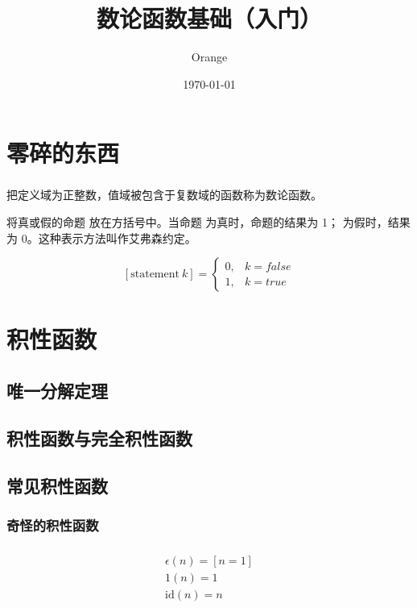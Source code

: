 \documentclass[UTF8]{beamer}
\title{数论函数基础（入门）}
\author{Orange}
\institute{CQ No.11 High}
\date{\today}
\begin{document}
	\heiti

	\begin{frame}
		\titlepage
	\end{frame}

	\section{零碎的东西}
	\begin{frame}
		\frametitle{\insertsection}
		把定义域为正整数，值域被包含于复数域的函数称为数论函数。

		\pause
		\bigskip
		将真或假的命题 放在方括号中。当命题 为真时，命题的结果为 1；
		为假时，结果为 0。这种表示方法叫作艾弗森约定。

		$$
		[\mathrm{statement}~k] =
		\left\{
		\begin{matrix}
		0, & k = false
		\\
		1, & k = true
		\end{matrix}
		\right.
		$$
	\end{frame}

	\section{积性函数}
	\subsection{唯一分解定理}
	\begin{frame}
		\frametitle{\insertsubsection}
	\end{frame}

	\subsection{积性函数与完全积性函数}
	\begin{frame}
		\frametitle{\insertsubsection}
	\end{frame}

	\subsection{常见积性函数}
	\subsubsection{奇怪的积性函数}
	\begin{frame}
		\frametitle{\insertsubsection}
		\begin{gather*}
			\epsilon(n) = [n = 1]
			\\
			\mathrm{1}(n) = 1
			\\
			\mathrm{id}(n) = n
		\end{gather*}
	\end{frame}
\end{document}
